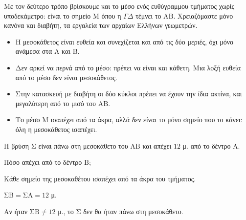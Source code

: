 \begin{center}
\end{center}

Με τον δεύτερο τρόπο βρίσκουμε και το μέσο ενός ευθύγραμμου τμήματος χωρίς υποδεκάμετρο: είναι το σημείο $\mathrm{Μ}$ όπου η $\Gamma\Delta$ τέμνει το $\mathrm{ΑΒ}$. Χρειαζόμαστε μόνο κανόνα και διαβήτη, τα εργαλεία των αρχαίων Ελλήνων γεωμετρών.

\begin{prosoxi}
\begin{itemize}[leftmargin=1.2em,itemsep=0.3ex,topsep=2pt]
\item Η μεσοκάθετος είναι ευθεία και συνεχίζεται και από τις δύο μεριές, όχι μόνο ανάμεσα στα $\mathrm{Α}$ και $\mathrm{Β}$.
\item Δεν αρκεί να περνά από το μέσο: πρέπει να είναι και κάθετη. Μια λοξή ευθεία από το μέσο δεν είναι μεσοκάθετος.
\item Στην κατασκευή με διαβήτη οι δύο κύκλοι πρέπει να έχουν την ίδια ακτίνα, και μεγαλύτερη από το μισό του $\mathrm{ΑΒ}$.
\item Το μέσο $\mathrm{Μ}$ ισαπέχει από τα άκρα, αλλά δεν είναι το μόνο σημείο που το κάνει: όλη η μεσοκάθετος ισαπέχει.
\end{itemize}
\end{prosoxi}


\tixero Η βρύση $\mathrm{Σ}$ είναι πάνω στη μεσοκάθετο του $\mathrm{ΑΒ}$ και απέχει $12$ μ. από το δέντρο $\mathrm{Α}$.\par
\tithelo Πόσο απέχει από το δέντρο $\mathrm{Β}$;\par
\possindeo Κάθε σημείο της μεσοκαθέτου ισαπέχει από τα άκρα του τμήματος.\par
\apantisi $\mathrm{ΣΒ}=\mathrm{ΣΑ}=12$ μ.\par
\elegxos Αν ήταν $\mathrm{ΣΒ}\neq12$ μ., το $\mathrm{Σ}$ δεν θα ήταν πάνω στη μεσοκάθετο.

